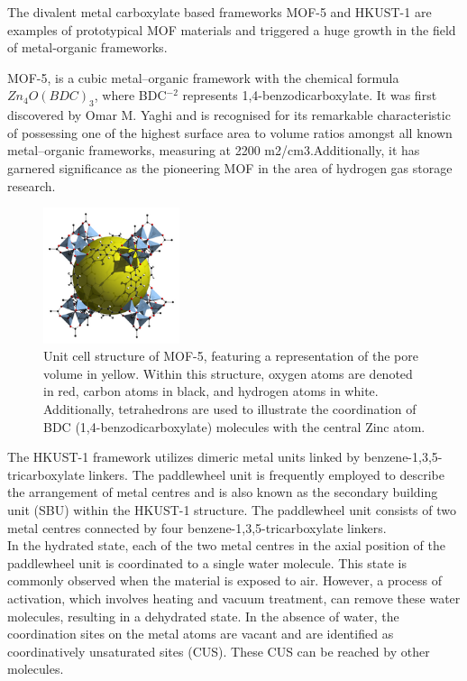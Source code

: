 \documentclass[../Master.tex]{subfiles}
\begin{document}
The divalent metal carboxylate based frameworks MOF-5 and HKUST-1 are examples of prototypical MOF materials and triggered a huge growth in the field of metal-organic frameworks.

MOF-5, is a cubic metal–organic framework with the chemical formula \(Zn_{4}O(BDC)_{3}\), where BDC$^{-2}$ represents 1,4-benzodicarboxylate. It was first discovered by Omar M. Yaghi and is recognised for its remarkable characteristic of possessing one of the highest surface area to volume ratios amongst all known metal–organic frameworks, measuring at 2200 m2/cm3.Additionally, it has garnered significance as the pioneering MOF in the area of hydrogen gas storage research.

\begin{figure}[h!]
	\centering
	\includegraphics[width=4cm,keepaspectratio]{Images/mof5.png}
	\caption{Unit cell structure of MOF-5, featuring a representation of the pore volume in yellow. Within this structure, oxygen atoms are denoted in red, carbon atoms in black, and hydrogen atoms in white. Additionally, tetrahedrons are used to illustrate the coordination of BDC (1,4-benzodicarboxylate) molecules with the central Zinc atom.}
\end{figure}

The HKUST-1 framework utilizes dimeric metal units linked by benzene-1,3,5-tricarboxylate linkers. The paddlewheel unit is frequently employed to describe the arrangement of metal centres and is also known as the secondary building unit (SBU) within the HKUST-1 structure. The paddlewheel unit consists of two metal centres connected by four benzene-1,3,5-tricarboxylate linkers.\\
In the hydrated state, each of the two metal centres in the axial position of the paddlewheel unit is coordinated to a single water molecule. This state is commonly observed when the material is exposed to air. However, a process of activation, which involves heating and vacuum treatment, can remove these water molecules, resulting in a dehydrated state. In the absence of water, the coordination sites on the metal atoms are vacant and are identified as coordinatively unsaturated sites (CUS). These CUS can be reached by other molecules.
\end{document}
